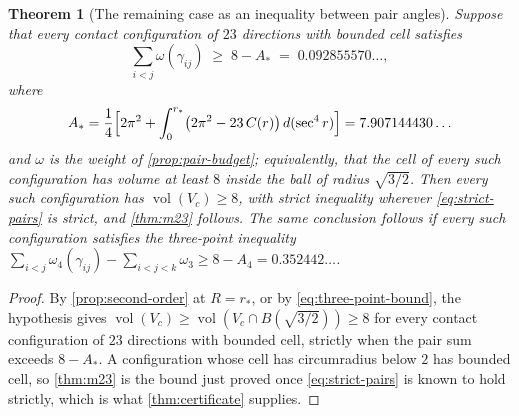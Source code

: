 \documentclass[11pt,reqno]{amsart}
\renewcommand{\_}{\origunderscore\allowbreak}
\numberwithin{equation}{section}
\theoremstyle{plain}
\newtheorem{thm}{Theorem}[section]
\theoremstyle{definition}
\theoremstyle{remark}
\DeclareMathOperator{\vol}{vol}
\begin{document}
\begin{thm}[The remaining case as an inequality between pair angles]\label{thm:strict-reduction}
Suppose that every contact configuration of $23$ directions with
bounded cell satisfies
\begin{equation}\label{eq:strict-pairs}
  \sum_{i<j}\omega(\gamma_{ij})\;\ge\;8-A_*\;=\;0.092855570\ldots ,
\end{equation}
where
\[
  A_*=\frac14\Bigl[2\pi^2+\int_0^{r_*}\bigl(2\pi^2-23\,C(r)\bigr)\,d(\sec^4r)\Bigr]
  =7.907144430\ldots
\]
and $\omega$ is the weight of \cref{prop:pair-budget}; equivalently, that
the cell of every such configuration has volume at least $8$ inside the
ball of radius $\sqrt{3/2}$. Then every such configuration has
$\vol(V_c)\ge8$, with strict inequality wherever \eqref{eq:strict-pairs}
is strict, and \cref{thm:m23} follows. The same conclusion follows if
every such configuration satisfies the three-point inequality
$\sum_{i<j}\omega_4(\gamma_{ij})-\sum_{i<j<k}\omega_3\ge8-A_4=0.352442\ldots$.
\end{thm}

\begin{proof}
By \cref{prop:second-order} at $R=r_*$, or by \eqref{eq:three-point-bound},
the hypothesis gives $\vol(V_c)\ge\vol(V_c\cap B(\sqrt{3/2}))\ge8$ for
every contact configuration of $23$ directions with bounded cell,
strictly when the pair sum exceeds $8-A_*$. A configuration whose cell
has circumradius below $2$ has bounded cell, so \cref{thm:m23} is the
bound just proved once \eqref{eq:strict-pairs} is known to hold
strictly, which is what \cref{thm:certificate} supplies.
\end{proof}
\end{document}
